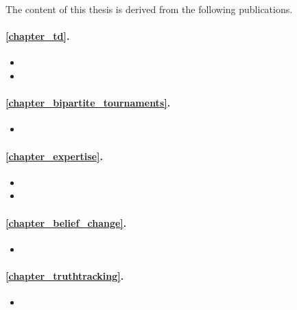 The content of this thesis is derived from the following publications.

\paragraph{\cref{chapter_td}.}
\begin{itemize}
    \item {}
    \item {}
\end{itemize}
\paragraph{\cref{chapter_bipartite_tournaments}.}
\begin{itemize}
    \item {}
\end{itemize}
\paragraph{\cref{chapter_expertise}.}
\begin{itemize}
    \item {}
    \item {}
\end{itemize}
\paragraph{\cref{chapter_belief_change}.}
\begin{itemize}
    \item {}
\end{itemize}
\paragraph{\cref{chapter_truthtracking}.}
\begin{itemize}
    \item {}
\end{itemize}
